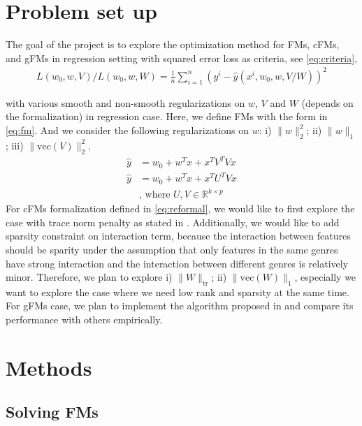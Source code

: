 \documentclass{article}
\newcommand{\tr}{\text{tr}}
\newcommand{\vecc}{\text{vec}}
\begin{document}
\section{Problem set up}

The goal of the project is to explore the optimization method for FMs, cFMs, and gFMs in regression setting with squared error loss as criteria, see \cref{eq:criteria},
\begin{align}
  L(w_0, w, V)/L(w_0, w, W) = \frac{1}{n}\sum_{i = 1}^n (y^i - \hat{y}(x^i, w_0, w, V/W))^2 \label{eq:criteria}
\end{align}

with various smooth and non-smooth regularizations on $w$, $V$ and $W$ (depends on the formalization) in regression case. Here, we define FMs with the form in \cref{eq:fm}. And we consider the following regularizations on $w$: i) $\|w\|_2^2$; ii) $\|w\|_1$; iii) $\|\vecc(V)\|_2^2$. 
\begin{align}
  \hat{y} &= w_0 + w^T x + x^T V^TV x \label{eq:fm} \\
  \hat{y} &= w_0 + w^T x + x^T U^TV x \label{eq:gfm} \\
& \text{, where $U, V \in \mathbb{R}^{k \times p}$} \nonumber
\end{align}
For cFMs formalization defined in \cref{eq:reformal}, we would like to first explore the case with trace norm penalty as stated in \cite{convexFM_paper}. Additionally, we would like to add sparsity constraint on interaction term, because the interaction between features should be sparity under the assumption that only features in the same genres have strong interaction and the interaction between different genres is relatively minor. Therefore, we plan to explore i) $\|W\|_{\tr}$; ii) $\|\vecc(W)\|_1$, especially we want to explore the case where we need low rank and sparsity at the same time. For gFMs case, we plan to implement the algorithm proposed in \cite{generalizedFM_paper} and compare its performance with others empirically.

\section{Methods}

\subsection{Solving FMs}
\end{document}
